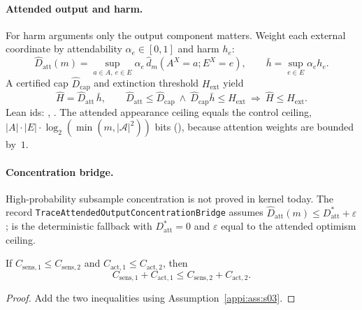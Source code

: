 \paragraph{Attended output and harm.}
For harm arguments only the output component matters.
Weight each external coordinate by attendability \(\alpha_e\in[0,1]\) and harm \(h_e\):
\begin{equation}
\label{appi:eq:attended-output}
\widehat D_{\mathrm{att}}(m)
=
\sup_{a\in A,\ e\in E}
\alpha_e\,\widehat d_m(A^X=a;E^X=e),
\qquad
\bar h=\sup_{e\in E}\alpha_e h_e.
\end{equation}
A certified cap \(\widehat D_{\mathrm{cap}}\) and extinction threshold \(H_{\mathrm{ext}}\) yield
\begin{equation}
\label{appi:eq:attended-harm}
\widehat H=\widehat D_{\mathrm{att}}\,\bar h,
\qquad
\widehat D_{\mathrm{att}}\leq \widehat D_{\mathrm{cap}}\ \wedge\ \widehat D_{\mathrm{cap}}\bar h\leq H_{\mathrm{ext}}
\ \Rightarrow\ \widehat H\leq H_{\mathrm{ext}}.
\end{equation}
Lean ids: , .
The attended appearance ceiling equals the control ceiling, \(|A|\cdot|E|\cdot\log_2(\min(m,|{\mathcal A}|^2))\) bits (), because attention weights are bounded by~\(1\).

\paragraph{Concentration bridge.}
High-probability subsample concentration is not proved in kernel today.
The record \texttt{TraceAttendedOutputConcentrationBridge} assumes \(\widehat D_{\mathrm{att}}(m)\leq D^\ast_{\mathrm{att}}+\varepsilon\);  is the deterministic fallback with \(D^\ast_{\mathrm{att}}=0\) and \(\varepsilon\) equal to the attended optimism ceiling.

\begin{lemma}
\label{appi:lem:p11}
If \(C_{\mathrm{sens},1}\leq C_{\mathrm{sens},2}\) and \(C_{\mathrm{act},1}\leq C_{\mathrm{act},2}\), then
\begin{equation}
\label{appi:eq:p11}
C_{\mathrm{sens},1}+C_{\mathrm{act},1}\leq C_{\mathrm{sens},2}+C_{\mathrm{act},2}.
\end{equation}
\end{lemma}
\begin{proof}
Add the two inequalities using Assumption~\ref{appi:ass:s03}.
\end{proof}

